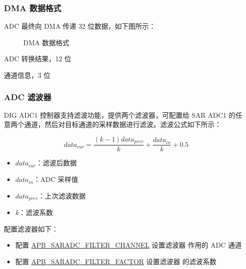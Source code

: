 \documentclass[main\_\_CN.tex]{subfiles}
\begin{document}
\subsubsection{DMA 数据格式}

ADC 最终向 DMA 传递 32 位数据，如下图所示：

\begin{figure}[H]
\centering
{}%
%
%
%
\end{figure}
\vspace{-2em}
\begin{figure}[H]
    \centering
    \caption{DMA 数据格式}
    \label{fig:dma-data-format}
\end{figure}
\vspace{-2em}
\begin{regdesc}\begin{reglist}
\item [data] ADC 转换结果，12 位
\item [ch\_sel] 通道信息，3 位
\end{reglist}\end{regdesc}


\subsubsection{ADC 滤波器}
DIG ADC1 控制器支持滤波功能，提供两个滤波器，可配置给 SAR ADC1 的任意两个通道，然后对目标通道的采样数据进行滤波。滤波公式如下所示：

\[data_{cur} = \frac{(k-1)data_{prev}}{k}+\frac{data_{in}}{k}+0.5\]

\begin{itemize}
    \item \(data_{cur}\)：滤波后数据
    \item \(data_{in}\)：ADC 采样值
    \item \(data_{prev}\)：上次滤波数据
    \item \(k\)：滤波系数
\end{itemize}

配置滤波器如下：
\begin{itemize}
\item 配置 \hyperref[fielddesc:APBSARADCFILTERCHANNEL0]{APB\_SARADC\_FILTER\_CHANNEL} 设置滤波器  作用的 ADC 通道
\item 配置 \hyperref[fielddesc:APBSARADCFILTERFACTOR0]{APB\_SARADC\_FILTER\_FACTOR} 设置滤波器  的滤波系数
\end{itemize}
\end{document}
